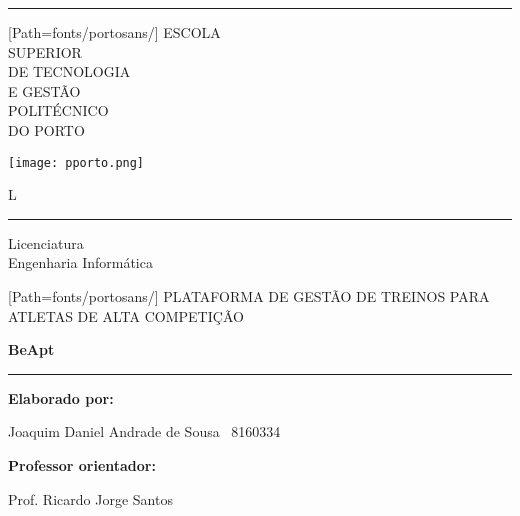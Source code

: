 \thispagestyle{empty}
{
	\setlength{\parindent}{0cm}

	\begin{titlepage}

		\begin{minipage}{.45\textwidth}
			\rule{0.5cm}{2pt}\vskip0.05cm

			{
				[Path=fonts/portosans/]
				\fontsize{6}{7}\selectfont
				\uppercase{Escola\\ Superior\\
				de Tecnologia\\ e Gestão\\
				Politécnico\\ do Porto}
			}
		\end{minipage}
		\begin{minipage}[t]{.45\textwidth}
			\vspace{0pt}
			\flushright
			\texttt{[image: pporto.png]}
		\end{minipage}

		\vspace{3.5cm}

		\begin{minipage}{1cm}
			{\fontsize{50}{60}\selectfont L}
		\end{minipage}
		\begin{minipage}{5cm}
			\rule{2cm}{2pt}\vskip0.05cm
			Licenciatura\\
			Engenharia Informática
		\end{minipage}

		\vspace{70pt}

		{
			[Path=fonts/portosans/]
			{\small\uppercase{Plataforma de gestão de treinos para atletas de alta competição}}
		}

		\vspace{0.25cm}

		{\huge\textbf{BeApt}}

		\rule{12cm}{3pt}\vskip0.05cm
		\date


		\vfill

		\begin{flushright}
			\textbf{Elaborado por:}
			\par
			Joaquim Daniel Andrade de Sousa \textemdash~8160334

			\vspace{10pt}

			\textbf{Professor orientador:}
			\par
			Prof. Ricardo Jorge Santos
		\end{flushright}

	\end{titlepage}
}